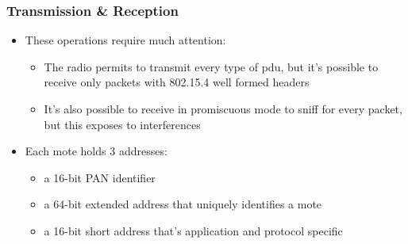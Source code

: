 \begin{frame}[fragile]
  \frametitle{Transmission \& Reception}
  \begin{itemize}
    \item These operations require much attention:
    \begin{itemize}
    	\item The radio permits to transmit every type of pdu, but it's possible to receive only packets with 802.15.4 well formed headers
    	\item It's also possible to receive in promiscuous mode to sniff for every packet, but this exposes to interferences
    \end{itemize}
    \item Each mote holds 3 addresses:
    \begin{itemize}
    	\item a 16-bit PAN identifier
    	\item a 64-bit extended address that uniquely identifies a mote
    	\item a 16-bit short address that's application and protocol specific
    \end{itemize}
  \end{itemize}
\end{frame}


